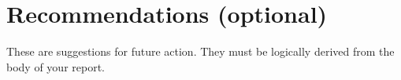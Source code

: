 \chapter{Recommendations (optional)}
These are suggestions for future action. They must be logically derived from the body of your report.
